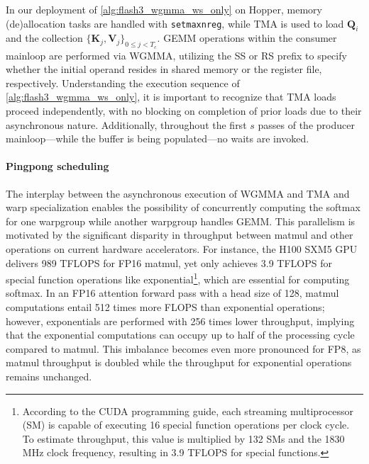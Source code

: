 In our deployment of \cref{alg:flash3_wgmma_ws_only} on Hopper, memory (de)allocation tasks are handled with \verb|setmaxnreg|, while TMA is used to load $\mathbf{Q}_i$ and the collection $\{ \mathbf{K}_j, \mathbf{V}_j \}_{0 \leq j < T_c}$. GEMM operations within the consumer mainloop are performed via WGMMA, utilizing the SS or RS prefix to specify whether the initial operand resides in shared memory or the register file, respectively. Understanding the execution sequence of \cref{alg:flash3_wgmma_ws_only}, it is important to recognize that TMA loads proceed independently, with no blocking on completion of prior loads due to their asynchronous nature. Additionally, throughout the first $s$ passes of the producer mainloop—while the buffer is being populated—no waits are invoked.

\paragraph{Pingpong scheduling} The interplay between the asynchronous execution of WGMMA and TMA and warp specialization enables the possibility of concurrently computing the softmax for one warpgroup while another warpgroup handles GEMM. This parallelism is motivated by the significant disparity in throughput between matmul and other operations on current hardware accelerators. For instance, the H100 SXM5 GPU delivers 989 TFLOPS for FP16 matmul, yet only achieves 3.9 TFLOPS for special function operations like exponential\footnote{According to the CUDA programming guide, each streaming multiprocessor (SM) is capable of executing 16 special function operations per clock cycle. To estimate throughput, this value is multiplied by 132 SMs and the 1830 MHz clock frequency, resulting in 3.9 TFLOPS for special functions.}, which are essential for computing softmax. In an FP16 attention forward pass with a head size of 128, matmul computations entail 512 times more FLOPS than exponential operations; however, exponentials are performed with 256 times lower throughput, implying that the exponential computations can occupy up to half of the processing cycle compared to matmul. This imbalance becomes even more pronounced for FP8, as matmul throughput is doubled while the throughput for exponential operations remains unchanged.

